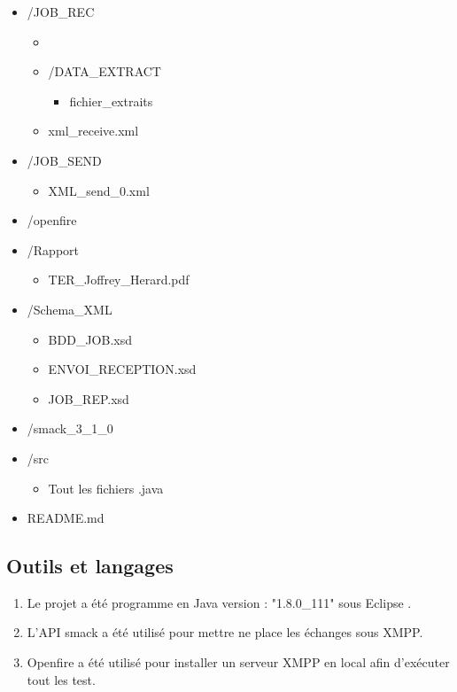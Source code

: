 \documentclass[11pt]{report}
\begin{document}
\begin{itemize}
\begin{itemize}
		\item /JOB\_REC \begin{itemize} \item \item /DATA\_EXTRACT \begin{itemize} \item fichier\_extraits\end{itemize}\item xml\_receive.xml  \end{itemize}
		\item /JOB\_SEND \begin{itemize}\item XML\_send\_0.xml \end{itemize}
		\item /openfire
		\item /Rapport \begin{itemize}\item TER\_Joffrey\_Herard.pdf  \end{itemize} 
		\item /Schema\_XML \begin{itemize}\item BDD\_JOB.xsd \item ENVOI\_RECEPTION.xsd \item JOB\_REP.xsd \end{itemize}
		\item /smack\_3\_1\_0
		\item /src \begin{itemize}\item Tout les fichiers .java \end{itemize}
		\item README.md 
\end{itemize}

\end{itemize}
\subsection{Outils et langages} 
\begin{enumerate}
\item Le projet a été programme en Java version : "1.8.0\_111" sous Eclipse  .
\item L'API smack a été utilisé pour mettre ne place les échanges sous XMPP.
\item Openfire a été utilisé pour installer un serveur XMPP en local afin d'exécuter tout les test.
\end{enumerate}
\newpage
\end{document}
